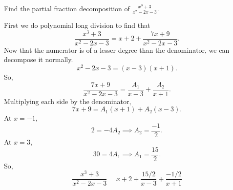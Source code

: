 \begin{example}
	Find the partial fraction decomposition of $\frac{x^3+3}{x^2-2x-3}$.
\end{example}
\begin{answer}
	First we do polynomial long division to find that
	\begin{equation*}
		\frac{x^3+3}{x^2-2x-3} = x + 2 + \frac{7x+9}{x^2-2x-3}.
	\end{equation*}
	Now that the numerator is of a lesser degree than the denominator, we can decompose it normally.
	\begin{equation*}
		x^2-2x-3 = (x-3)(x+1).
	\end{equation*}
	So,
	\begin{equation*}
		\frac{7x+9}{x^2-2x-3} = \frac{A_1}{x-3} + \frac{A_2}{x+1}.
	\end{equation*}
	Multiplying each side by the denominator,
	\begin{equation*}
		7x+9 = A_1(x+1) + A_2(x-3).
	\end{equation*}
	At $x=-1$,
	\begin{equation*}
		2 = -4A_2 \implies A_2 = \frac{-1}{2}.
	\end{equation*}
	At $x=3$,
	\begin{equation*}
		30 = 4A_1 \implies A_1 = \frac{15}{2}.
	\end{equation*}
	So,
	\begin{equation*}
		\frac{x^3+3}{x^2-2x-3} = x + 2 + \frac{15/2}{x-3} + \frac{-1/2}{x+1}
	\end{equation*}
\end{answer}